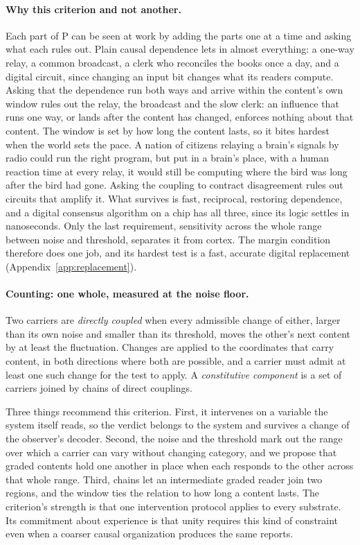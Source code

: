 \documentclass[12pt]{article}
\begin{document}
\paragraph{Why this criterion and not another.} Each part of P can be seen at
work by adding the parts one at a time and asking what each rules out. Plain
causal dependence lets in almost everything: a one-way relay, a common
broadcast, a clerk who reconciles the books once a day, and a digital circuit,
since changing an input bit changes what its readers compute. Asking that the
dependence run both ways and arrive within the content's own window rules out
the relay, the broadcast and the slow clerk: an influence that runs one way, or
lands after the content has changed, enforces nothing about that content. The
window is set by how long the content lasts, so it bites hardest when the world
sets the pace. A nation of citizens relaying a brain's signals by radio
\citep{block1978} could run the right program, but put in a brain's place, with
a human reaction time at every relay, it would still be computing where the
bird was long after the bird had gone. Asking the coupling to contract
disagreement rules out circuits that amplify it. What survives is fast,
reciprocal, restoring dependence, and a digital consensus algorithm on a chip
has all three, since its logic settles in nanoseconds. Only the last
requirement, sensitivity across the whole range between noise and threshold,
separates it from cortex. The margin condition therefore does one job, and its
hardest test is a fast, accurate digital replacement
(Appendix~\ref{app:replacement}).

\paragraph{Counting: one whole, measured at the noise floor.} Two carriers are
\emph{directly coupled} when every admissible change of either, larger than its
own noise and smaller than its threshold, moves the other's next content by at
least the fluctuation. Changes are applied to the coordinates that carry
content, in both directions where both are possible, and a carrier must admit
at least one such change for the test to apply. A \emph{constitutive component}
is a set of carriers joined by chains of direct couplings.

Three things recommend this criterion. First, it intervenes on a variable the
system itself reads, so the verdict belongs to the system and survives a change
of the observer's decoder. Second, the noise and the threshold mark out the
range over which a carrier can vary without changing category, and we propose
that graded contents hold one another in place when each responds to the other
across that whole range. Third, chains let an intermediate graded reader join
two regions, and the window ties the relation to how long a content lasts. The
criterion's strength is that one intervention protocol applies to every
substrate. Its commitment about experience is that unity requires this kind of
constraint even when a coarser causal organization produces the same reports.
\end{document}
